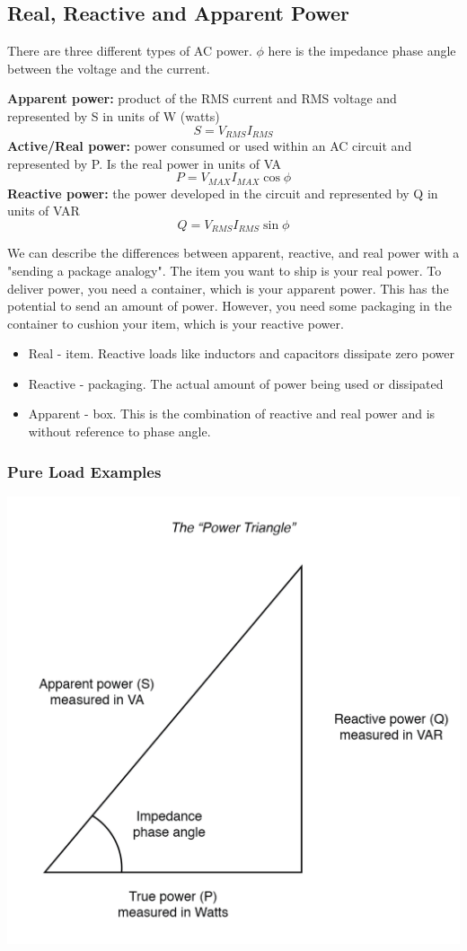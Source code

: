 \subsection{Real, Reactive and Apparent Power}
There are three different types of AC power. $\phi$ here is the impedance phase angle between the voltage and the current.
\begin{define}
    \textbf{Apparent power:} product of the RMS current and RMS voltage and represented by S in units of W (watts)
    \[S = V_{RMS} I_{RMS}\]
    \textbf{Active/Real power:} power consumed or used within an AC circuit and represented by P. Is the real power in units of VA
    \[P = V_{MAX} I_{MAX} \cos{\phi}\]
    \textbf{Reactive power:} the power developed in the circuit and represented by Q in units of VAR
    \[Q = V_{RMS} I_{RMS} \sin{\phi}\]
\end{define}

We can describe the differences between apparent, reactive, and real power with a "sending a package analogy". The item you want to ship is your real power. To deliver power, you need a container, which is your apparent power. This has the potential to send an amount of power. However, you need some packaging in the container to cushion your item, which is your reactive power.
\begin{itemize}
    \item Real - item. Reactive loads like inductors and capacitors dissipate zero power
    \item Reactive - packaging. The actual amount of power being used or dissipated
    \item Apparent - box. This is the combination of reactive and real power and is without reference to phase angle.
\end{itemize}

\subsubsection{Pure Load Examples}


\begin{center}
    \includegraphics[scale=0.2]{figs/1_1_2_power_triangle.png}
\end{center}